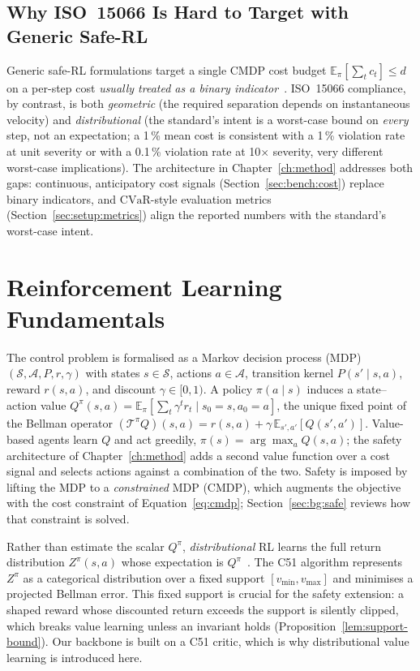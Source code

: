 \documentclass[11pt,a4paper]{report}
\newcommand{\iso}{ISO~15066}
\newcommand{\cvar}{\ensuremath{\mathrm{CVaR}}}
\begin{document}
\subsection{Why \iso{} Is Hard to Target with Generic Safe-RL}
\label{sec:bg:iso:hard}

Generic safe-RL formulations target a single CMDP cost budget
$\mathbb{E}_{\pi}[\sum_t c_t] \le d$ on a per-step cost
\emph{usually treated as a binary indicator}~\cite{ray2019safetygym,
achiam2017cpo,stooke2020pid}. \iso{} compliance, by contrast, is
both \emph{geometric} (the required separation depends on
instantaneous velocity) and \emph{distributional} (the standard's
intent is a worst-case bound on \emph{every} step, not an
expectation; a 1\,\% mean cost is consistent with a 1\,\% violation
rate at unit severity or with a 0.1\,\% violation rate at
10$\times$ severity, very different worst-case implications).
The architecture in Chapter~\ref{ch:method} addresses both gaps:
continuous, anticipatory cost signals
(Section~\ref{sec:bench:cost}) replace binary indicators, and
\cvar-style evaluation metrics (Section~\ref{sec:setup:metrics})
align the reported numbers with the standard's worst-case intent.

\section{Reinforcement Learning Fundamentals}
\label{sec:bg:rl}

The control problem is formalised as a Markov decision process (MDP)
$(\mathcal{S}, \mathcal{A}, P, r, \gamma)$ with states $s \in
\mathcal{S}$, actions $a \in \mathcal{A}$, transition kernel
$P(s' \mid s, a)$, reward $r(s,a)$, and discount $\gamma \in [0,1)$. A
policy $\pi(a \mid s)$ induces a state--action value
$Q^{\pi}(s,a) = \mathbb{E}_{\pi}[\sum_t \gamma^t r_t \mid s_0 = s, a_0 =
a]$, the unique fixed point of the Bellman operator
$(\mathcal{T}^{\pi} Q)(s,a) = r(s,a) + \gamma\,
\mathbb{E}_{s',a'}[Q(s',a')]$. Value-based agents learn $Q$ and act
greedily, $\pi(s) = \arg\max_a Q(s,a)$; the safety architecture of
Chapter~\ref{ch:method} adds a second value function over a cost signal
and selects actions against a combination of the two. Safety is imposed
by lifting the MDP to a \emph{constrained} MDP (CMDP), which augments
the objective with the cost constraint of Equation~\ref{eq:cmdp};
Section~\ref{sec:bg:safe} reviews how that constraint is solved.

Rather than estimate the scalar $Q^{\pi}$, \emph{distributional} RL
learns the full return distribution $Z^{\pi}(s,a)$ whose expectation is
$Q^{\pi}$~\cite{bellemare2017c51}. The C51 algorithm represents
$Z^{\pi}$ as a categorical distribution over a fixed support
$[v_{\min}, v_{\max}]$ and minimises a projected Bellman error. This
fixed support is crucial for the safety extension: a shaped reward
whose discounted return exceeds the support is silently clipped, which
breaks value learning unless an invariant holds
(Proposition~\ref{lem:support-bound}). Our backbone is built on a C51
critic, which is why distributional value learning is introduced here.
\end{document}
